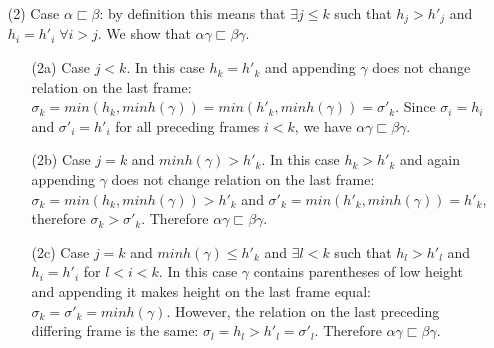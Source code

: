 \documentclass[AMA,STIX1COL]{WileyNJD-v2}
\begin{document}
\begin{proofEnd}
\begin{itemize}[itemsep=0.2em, topsep=0.5em]
    \item[(2)]
        Case $\alpha \sqsubset \beta$:
        by definition this means that $\exists j \leq k$ such that $h_j > h'_j$ and $h_i = h'_i \;\forall i > j$.
        We show that $\alpha \gamma \sqsubset \beta \gamma$.
        \begin{itemize}
        \item[(2a)]
            Case $j < k$. In this case $h_k = h'_k$
            and appending $\gamma$ does not change relation on the last frame:
            $\sigma_k = min (h_k, minh (\gamma)) = min (h'_k, minh (\gamma)) = \sigma'_k$.
            Since $\sigma_i = h_i$ and $\sigma'_i = h'_i$ for all preceding frames $i < k$,
            we have $\alpha \gamma \sqsubset \beta \gamma$.

        \item[(2b)]
            Case $j = k$ and $minh (\gamma) > h'_k$.
            In this case $h_k > h'_k$
            and again appending $\gamma$ does not change relation on the last frame:
            $\sigma_k = min (h_k, minh (\gamma)) > h'_k$ and
            $\sigma'_k = min (h'_k, minh (\gamma)) = h'_k$, therefore
            $\sigma_k > \sigma'_k$.
            Therefore $\alpha \gamma \sqsubset \beta \gamma$.

        \item[(2c)]
            Case $j = k$ and $minh (\gamma) \leq h'_k$
            and $\exists l < k$ such that $h_l > h'_l$ and $h_i = h'_i$ for $l < i < k$.
            In this case $\gamma$ contains parentheses of low height
            and appending it makes height on the last frame equal:
            $\sigma_k = \sigma'_k = minh (\gamma)$.
            However, the relation on the last preceding differing frame is the same:
            $\sigma_l = h_l > h'_l = \sigma'_l$.
            Therefore $\alpha \gamma \sqsubset \beta \gamma$.


\end{itemize}
\end{itemize}
\end{proofEnd}
\end{document}
